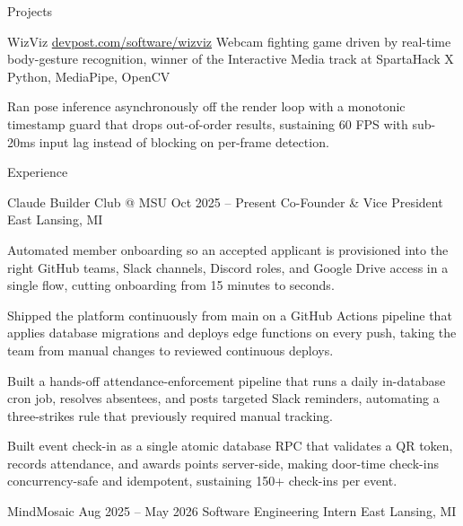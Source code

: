 \documentclass[
	11pt
]{../../../template}
\begin{document}
\begin{rSection}{P}{rojects}
		\begin{rSectionEntry}
			{WizViz}
			{\href{https://devpost.com/software/wizviz}{devpost.com/software/wizviz}}
			{Webcam fighting game driven by real-time body-gesture recognition, winner of the Interactive Media track at SpartaHack X}
			{Python, MediaPipe, OpenCV}
			{}

			\item Ran pose inference asynchronously off the render loop with a monotonic timestamp guard that drops out-of-order results, sustaining 60 FPS with sub-20ms input lag instead of blocking on per-frame detection.
		\end{rSectionEntry}
	\end{rSection}

	\begin{rSection}{E}{xperience}
		\begin{rSectionEntry}
			{Claude Builder Club @ MSU}
			{Oct 2025 -- Present}
			{Co-Founder \& Vice President}
			{}
			{East Lansing, MI}

			\item Automated member onboarding so an accepted applicant is provisioned into the right GitHub teams, Slack channels, Discord roles, and Google Drive access in a single flow, cutting onboarding from 15 minutes to seconds.
			\item Shipped the platform continuously from main on a GitHub Actions pipeline that applies database migrations and deploys edge functions on every push, taking the team from manual changes to reviewed continuous deploys.
			\item Built a hands-off attendance-enforcement pipeline that runs a daily in-database cron job, resolves absentees, and posts targeted Slack reminders, automating a three-strikes rule that previously required manual tracking.
			\item Built event check-in as a single atomic database RPC that validates a QR token, records attendance, and awards points server-side, making door-time check-ins concurrency-safe and idempotent, sustaining 150+ check-ins per event.
		\end{rSectionEntry}

		\begin{rSectionEntry}
			{MindMosaic}
			{Aug 2025 -- May 2026}
			{Software Engineering Intern}
			{}
			{East Lansing, MI}


\end{rSectionEntry}
\end{rSection}
\end{document}
